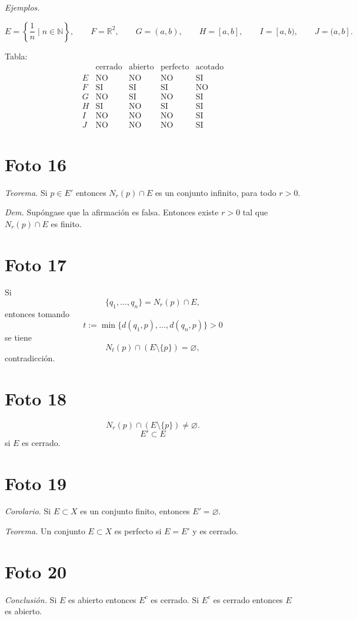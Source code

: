 \documentclass[12pt]{article}
\begin{document}
\textit{Ejemplos.}

\[
E=\left\{\frac1n\mid n\in\mathbb N\right\},\qquad F=\mathbb R^2,\qquad
G=(a,b),\qquad H=[a,b],\qquad I=[a,b),\qquad J=(a,b].
\]

Tabla:
\[
\begin{array}{c|cccc}
 & \text{cerrado} & \text{abierto} & \text{perfecto} & \text{acotado}\\
\hline
E & \text{NO} & \text{NO} & \text{NO} & \text{SI}\\
F & \text{SI} & \text{SI} & \text{SI} & \text{NO}\\
G & \text{NO} & \text{SI} & \text{NO} & \text{SI}\\
H & \text{SI} & \text{NO} & \text{SI} & \text{SI}\\
I & \text{NO} & \text{NO} & \text{NO} & \text{SI}\\
J & \text{NO} & \text{NO} & \text{NO} & \text{SI}
\end{array}
\]

\section*{Foto 16}

\textit{Teorema.}
Si $p\in E'$ entonces $N_r(p)\cap E$ es un conjunto infinito, para todo $r>0$.

\textit{Dem.}
Sup\'ongase que la afirmaci\'on es falsa.
Entonces existe $r>0$ tal que $N_r(p)\cap E$ es finito.

\section*{Foto 17}

Si
\[
\{q_1,\dots,q_n\}=N_r(p)\cap E,
\]
entonces tomando
\[
t:=\min\{d(q_1,p),\dots,d(q_n,p)\}>0
\]
se tiene
\[
N_t(p)\cap(E\setminus\{p\})=\varnothing,
\]
contradicci\'on.

\section*{Foto 18}

\[
N_r(p)\cap(E\setminus\{p\})\neq\varnothing.
\]
\[
E'\subset E
\]
si $E$ es cerrado.

\section*{Foto 19}

\textit{Corolario.} Si $E\subset X$ es un conjunto finito, entonces $E'=\varnothing$.

\textit{Teorema.} Un conjunto $E\subset X$ es perfecto si $E=E'$ y es cerrado.

\section*{Foto 20}

\textit{Conclusi\'on.}
Si $E$ es abierto entonces $E^c$ es cerrado.
Si $E^c$ es cerrado entonces $E$ es abierto.
\end{document}
